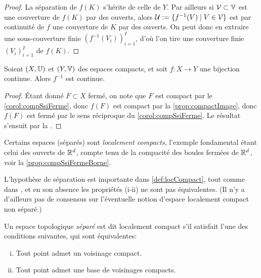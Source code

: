 \begin{proof}
	La séparation de $f(K)$ s'hérite de celle de $Y$. Par ailleurs si $\mathcal{V}\subset \mathbb{V}$ est une couverture de $f(K)$ par des ouverts, alors $\mathcal{U} := \{f^{-1}(V) \mid V \in \mathcal{V}\}$ est par continuité de $f$ une couverture de $K$ par des ouverts. 
	On peut donc en extraire une sous-couverture finie $(f^{-1}(V_i))_{i=1}^I$, d'où l'on tire une couverture finie $(V_i)_{i=1}^I$ de $f(K)$. 
\end{proof}

\begin{corollary}
\label{corol:homeoCompact}
%
	Soient $(X, \mathbb{U})$ et $(Y,\mathbb{V})$ des espaces compacts, et soit $f : X \to Y$ une bijection continue. Alors $f^{-1}$ est continue. 
\end{corollary}

\begin{proof}
Étant donné $F\subset X$ fermé, on note que $F$ est compact par le \cref{corol:compSsiFerme}, donc $f(F)$ est compact par la \cref{prop:compactImage}, donc $f(F)$ est fermé par le sens réciproque du \cref{corol:compSsiFerme}. 
Le résultat s'ensuit par la . 
\end{proof}


Certains espaces (séparés) sont \emph{localement compacts}, l'exemple fondamental étant celui des ouverts de $\mathbb{R}^d$, compte tenu de la compacité des boules fermées de $\mathbb{R}^d$, voir la  \cref{prop:compSsiFermeBorne}.

L'hypothèse de séparation est importante dans \cref{def:locCompact}, tout comme dans , et en son absence les propriétés (i-ii) ne sont pas équivalentes. (Il n'y a d'ailleurs pas de consensus sur l'éventuelle notion d'espace localement compact non séparé.)


\begin{definition}
\label{def:locCompact}
%
Un espace topologique \emph{séparé} est dit localement compact s'il satisfait l'une des conditions suivantes, qui sont équivalentes:
\begin{enumerate}[(i)]
	\item Tout point admet un voisinage compact.
	\item Tout point admet une base de voisinages compacts. 
\end{enumerate}
\end{definition}

